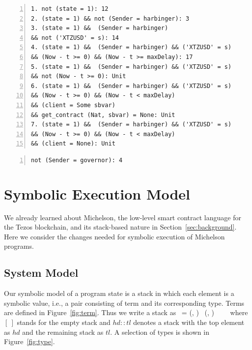 \documentclass[a4paper,USenglish,cleveref, autoref, thm-restate]{lipics-v2021}
\begin{document}
\begin{lstlisting}[float=tp,captionpos=b,caption={Failwith condition for the entrypoint setXtzUsdPrice\_callback},label={lst:setXtzUsdPrice_callback},numbers=left]
1. not (state = 1): 12
2. (state = 1) && not (Sender = harbinger): 3
3. (state = 1) &&  (Sender = harbinger) 
&& not ('XTZUSD' = s): 14
4. (state = 1) &&  (Sender = harbinger) && ('XTZUSD' = s)
&& (Now - t >= 0) && (Now - t >= maxDelay): 17
5. (state = 1) &&  (Sender = harbinger) && ('XTZUSD' = s)
&& not (Now - t >= 0): Unit
6. (state = 1) &&  (Sender = harbinger) && ('XTZUSD' = s)
&& (Now - t >= 0) && (Now - t < maxDelay) 
&& (client = Some sbvar) 
&& get_contract (Nat, sbvar) = None: Unit
7. (state = 1) &&  (Sender = harbinger) && ('XTZUSD' = s)
&& (Now - t >= 0) && (Now - t < maxDelay) 
&& (client = None): Unit
\end{lstlisting}

\begin{lstlisting}[float=tp,captionpos=b,caption={Failwith condition for the entrypoint setMaxDataDelaySec},label={lst:setMaxDataDelaySec},numbers=left]
not (Sender = governor): 4
\end{lstlisting}
\section{Symbolic Execution Model}
\label{sec:symbolic-execution-model}

We already learned about Michelson, the low-level smart contract
language for the Tezos blockchain, and its stack-based nature in
Section~\ref{sec:background}.  Here we consider the changes needed for
symbolic execution of Michelson programs.

\subsection{System Model}
\label{sec:system-model}

Our symbolic model of a program state is a stack in which each element
is a symbolic value, i.e., a pair consisting
of term and its corresponding type. Terms are defined in
Figure~\ref{fig:term}. Thus we write a stack as \STACK\ = (\TermOne,
\TYF) \STACKCONCAT\ (\TermTwo, \TYS) \STACKCONCAT\ \DOT\ \STACKCONCAT\ 
\EMPTYSTACK\ where \ensuremath{[\ ]} stands for the empty stack and
\ensuremath{hd :: tl} denotes a stack with the top element as
\ensuremath{hd} and the remaining stack as \ensuremath{tl}. 
A selection of types is shown in Figure~\ref{fig:type}.
\end{document}

